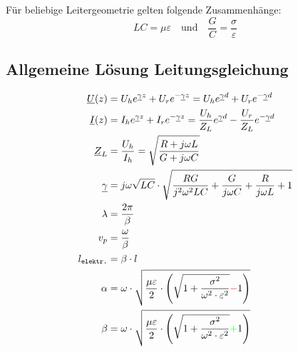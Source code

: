 \vspace{1ex}
Für beliebige Leitergeometrie gelten folgende Zusammenhänge:
\[
    LC = \mu\varepsilon \quad \text{und} \quad \frac{G}{C} = \frac{\sigma}{\varepsilon}
\]

\subsection{Allgemeine Lösung Leitungsgleichung}
\begin{align*}
    \underline{U}(z)   & = U_h e^{\underline{\gamma} z} + U_r e^{-\underline{\gamma} z} = U_h e^{\underline{\gamma} d} + U_r e^{-\underline{\gamma} d}                       \\
    \underline{I}(z)   & = I_h e^{\underline{\gamma} z} + I_r e^{-\underline{\gamma} z} = \frac{U_h}{Z_L}e^{\underline{\gamma} d} - \frac{U_r}{Z_L}e^{-\underline{\gamma} d} \\
    \underline{Z}_L    & = \frac{U_h}{I_h} = \sqrt{ \frac{R + j \omega L}{G + j \omega C}}                                                                                   \\
    \underline{\gamma} & = j \omega \sqrt{LC} \cdot \sqrt{ \frac{RG}{j^2 \omega^2 LC} + \frac{G}{j \omega C} + \frac{R}{j \omega L} + 1}                                     \\
    \lambda            & = \frac{2 \pi}{\beta}                                                                                                                               \\
    v_p                & = \frac{\omega}{\beta}                                                                                                                              \\
    l_\texttt{elektr.} & = \beta \cdot l                                                                                                                                     \\
    \alpha             & = \omega \cdot \sqrt{\dfrac{\mu \varepsilon}{2}\cdot \left(\sqrt{1+\dfrac{\sigma^2}{\omega^2\cdot\varepsilon^2}}{\color{red}{-}}1\right)}           \\
    \beta              & = \omega \cdot \sqrt{\dfrac{\mu \varepsilon}{2}\cdot \left(\sqrt{1+\dfrac{\sigma^2}{\omega^2\cdot\varepsilon^2}}{\color{green}{+}}1\right)}
\end{align*}

